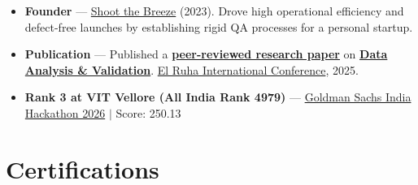 \documentclass[a4paper,10pt]{article}
\newcommand{\ulink}[2]{\href{#1}{#2}}
\begin{document}
\begin{itemize}[nosep, leftmargin=1.5em, itemsep=2pt, topsep=2pt]
  \item {\color[HTML]{0A0A0A}\fontsize{11}{14}\selectfont \textbf{Founder} --- \ulink{https://shoot-the-breeze.vercel.app}{Shoot the Breeze} (2023). Drove high operational efficiency and defect-free launches by establishing rigid QA processes for a personal startup.}
  \item {\color[HTML]{0A0A0A}\fontsize{11}{14}\selectfont \textbf{Publication} --- Published a \ulink{https://www.elruha.org/_files/ugd/614b1f_6b95e1b697bf452b9907ba46e0151c05.pdf\#page=774}{\textbf{peer-reviewed research paper}} on \ulink{https://github.com/su-jin1425/Set-Project}{\textbf{Data Analysis \& Validation}}. \ulink{https://www.elruha.org/congress-books}{El Ruha International Conference}, 2025.}
  \item {\color[HTML]{0A0A0A}\fontsize{11}{14}\selectfont \textbf{Rank 3 at VIT Vellore (All India Rank 4979)} --- \ulink{https://www.hackerrank.com/contests/goldman-sachs-india-hackathon-2026-cs/leaderboard}{Goldman Sachs India Hackathon 2026} $|$ Score: 250.13}
\end{itemize}

\section{Certifications}
\vspace{2pt}
\end{document}
